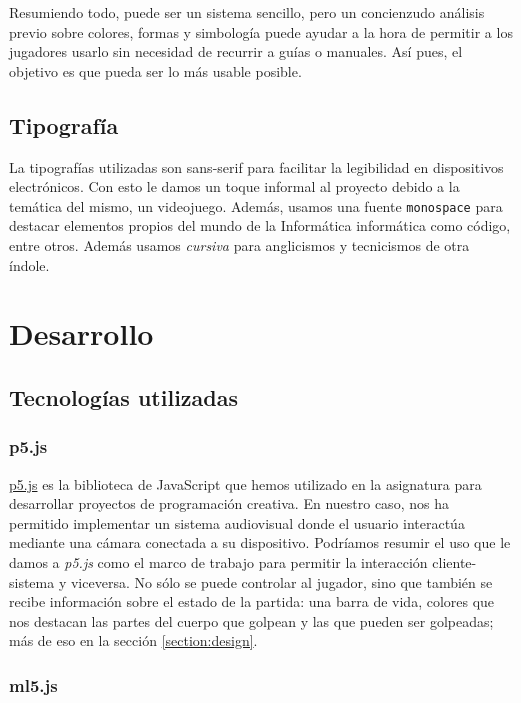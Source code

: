 \documentclass{article}
\begin{document}
Resumiendo todo, puede ser un sistema sencillo, pero un concienzudo análisis previo sobre colores, formas y simbología puede ayudar a la hora de permitir a los jugadores usarlo sin necesidad de recurrir a guías o manuales. Así pues, el objetivo es que pueda ser lo más usable posible.

\subsection{Tipografía}

La tipografías utilizadas son sans-serif para facilitar la legibilidad en dispositivos electrónicos. Con esto le damos un toque informal al proyecto debido a la temática del mismo, un videojuego. Además, usamos una fuente \texttt{monospace} para destacar elementos propios del mundo de la Informática informática como código, entre otros. Además usamos \textit{cursiva} para anglicismos y tecnicismos de otra índole.

\section{Desarrollo}
\label{section:development}

\subsection{Tecnologías utilizadas}

\subsubsection{p5.js}

\href{https://p5js.org/es/}{p5.js} es la biblioteca de JavaScript que hemos utilizado en la asignatura para desarrollar proyectos de programación creativa. En nuestro caso, nos ha permitido implementar un sistema audiovisual donde el usuario interactúa mediante una cámara conectada a su dispositivo. Podríamos resumir el uso que le damos a \textit{p5.js} como el marco de trabajo para permitir la interacción cliente-sistema y viceversa. No sólo se puede controlar al jugador, sino que también se recibe información sobre el estado de la partida: una barra de vida, colores que nos destacan las partes del cuerpo que golpean y las que pueden ser golpeadas; más de eso en la sección \ref{section:design}.

\subsubsection{ml5.js}
\label{section:ml5}
\end{document}

